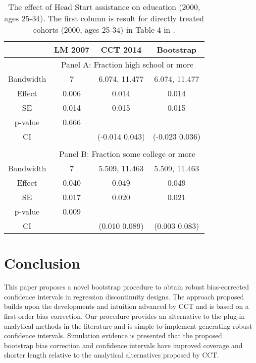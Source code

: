 \documentclass[12pt,fleqn]{article}
\begin{document}
\begin{table}[ht]
	\centering
	\begin{tabular}{cccc}
		\toprule
		& LM 2007 & CCT 2014 & Bootstrap \\
		\midrule
		& \multicolumn{3}{c}{Panel A: Fraction high school or more} \\
		Bandwidth & 7 & 6.074, 11.477 & 6.074, 11.477 \\
		Effect    & 0.006 & 0.014 & 0.014 \\
		SE        & 0.014 & 0.015 & 0.015 \\
		p-value   & 0.666 & & \\
		CI        & & (-0.014 0.043) & (-0.023 0.036) \\

		&&& \\
		& \multicolumn{3}{c}{Panel B: Fraction some college or more} \\
		Bandwidth & 7 & 5.509, 11.463 & 5.509, 11.463 \\
		Effect    & 0.040 & 0.049 & 0.049 \\
		SE        & 0.017 & 0.020 & 0.021 \\
		p-value   & 0.009 & & \\
		CI        & & (0.010 0.089) & (0.003 0.083) \\
		\bottomrule
	\end{tabular}
	\caption{The effect of Head Start assistance on education (2000, ages 25-34). The first column is result for directly treated cohorts (2000, ages 25-34) in Table 4 in \cite{ludwig2007}.}
	\label{tab: education 2000 ages 25-34}
\end{table}

\section{Conclusion}\label{conclusion}
This paper proposes a novel bootstrap procedure to obtain robust bias-corrected
confidence intervals in regression discontinuity designs.
The approach proposed builds upon the developments and intuition advanced by CCT and is based on a first-order bias correction.
Our procedure provides an alternative to the plug-in analytical methods in the literature and is simple to implement generating robust confidence intervals.
Simulation evidence is presented that the proposed bootstrap bias correction and confidence intervals have improved coverage and shorter length relative to the analytical alternatives proposed by CCT.
\end{document}
